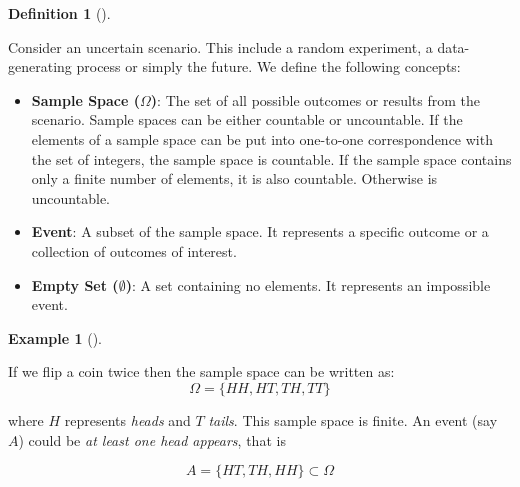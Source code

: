 \documentclass[
  letterpaper,
  DIV=11,
  numbers=noendperiod]{scrreport}
\newenvironment{Shaded}{\begin{snugshade}}{\end{snugshade}}
\theoremstyle{definition}
\newtheorem{example}{Example}[chapter]
\theoremstyle{plain}
\theoremstyle{plain}
\theoremstyle{definition}
\newtheorem{definition}{Definition}[chapter]
\theoremstyle{remark}
\begin{document}
\begin{tcolorbox}[enhanced jigsaw, opacitybacktitle=0.6, bottomtitle=1mm, opacityback=0, toprule=.15mm, colbacktitle=quarto-callout-note-color!10!white, colback=white, left=2mm, title={Definition: Sample Space, Event, and Empty Set}, breakable, rightrule=.15mm, leftrule=.75mm, titlerule=0mm, colframe=quarto-callout-note-color-frame, arc=.35mm, coltitle=black, toptitle=1mm, bottomrule=.15mm]

\begin{definition}[]\protect\hypertarget{def-1.1.1}{}\label{def-1.1.1}

Consider an uncertain scenario. This include a random experiment, a
data-generating process or simply the future. We define the following
concepts:

\begin{Shaded}
\begin{Highlighting}[numbers=left,,]

\end{Highlighting}
\end{Shaded}

\begin{itemize}
\item
  \textbf{Sample Space (\(\Omega\))}: The set of all possible outcomes
  or results from the scenario. Sample spaces can be either countable or
  uncountable. If the elements of a sample space can be put into
  one-to-one correspondence with the set of integers, the sample space
  is countable. If the sample space contains only a finite number of
  elements, it is also countable. Otherwise is uncountable.
\item
  \textbf{Event}: A subset of the sample space. It represents a specific
  outcome or a collection of outcomes of interest.
\item
  \textbf{Empty Set (\(\emptyset\))}: A set containing no elements. It
  represents an impossible event.
\end{itemize}

\end{definition}

\end{tcolorbox}

\begin{example}[]\protect\hypertarget{exm-1-1.1}{}\label{exm-1-1.1}

If we flip a coin twice then the sample space can be written as: \[
\Omega =\{HH,HT,TH,TT\}
\]

where \(H\) represents \emph{heads} and \(T\) \emph{tails}. This sample
space is finite. An event (say \(A\)) could be \emph{at least one head
appears}, that is

\[A =\{HT,TH,HH\}\subset \Omega\]

\end{example}
\end{document}
